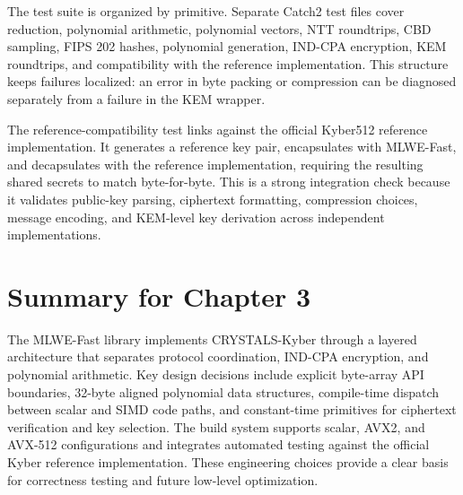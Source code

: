 The test suite is organized by primitive. Separate Catch2 test files cover reduction, polynomial arithmetic, polynomial vectors, NTT roundtrips, CBD sampling, FIPS 202 hashes, polynomial generation, IND-CPA encryption, KEM roundtrips, and compatibility with the reference implementation. This structure keeps failures localized: an error in byte packing or compression can be diagnosed separately from a failure in the KEM wrapper.

The reference-compatibility test links against the official Kyber512 reference implementation. It generates a reference key pair, encapsulates with MLWE-Fast, and decapsulates with the reference implementation, requiring the resulting shared secrets to match byte-for-byte. This is a strong integration check because it validates public-key parsing, ciphertext formatting, compression choices, message encoding, and KEM-level key derivation across independent implementations.

\section{Summary for Chapter 3}
\label{sec:implementation_summary}

The MLWE-Fast library implements CRYSTALS-Kyber through a layered architecture that separates protocol coordination, IND-CPA encryption, and polynomial arithmetic. Key design decisions include explicit byte-array API boundaries, 32-byte aligned polynomial data structures, compile-time dispatch between scalar and SIMD code paths, and constant-time primitives for ciphertext verification and key selection. The build system supports scalar, AVX2, and AVX-512 configurations and integrates automated testing against the official Kyber reference implementation. These engineering choices provide a clear basis for correctness testing and future low-level optimization.
